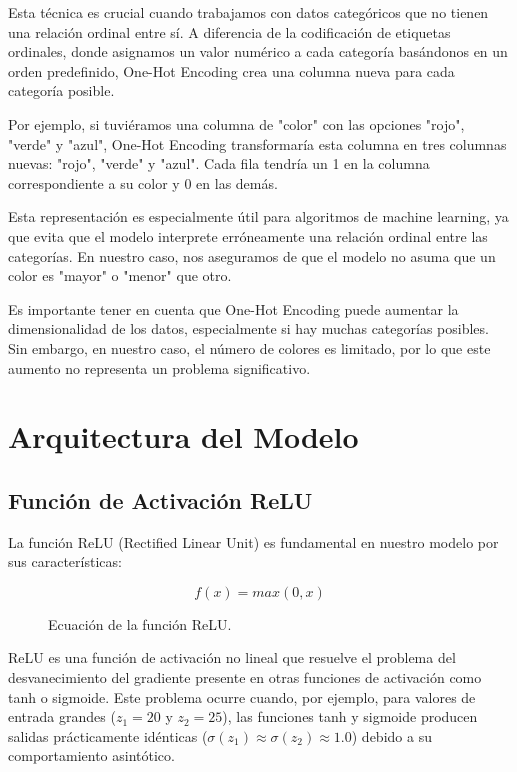 Esta técnica es crucial cuando trabajamos con datos categóricos que no tienen una relación ordinal entre sí. A diferencia de la codificación de etiquetas ordinales, donde asignamos un valor numérico a cada categoría basándonos en un orden predefinido, One-Hot Encoding crea una columna nueva para cada categoría posible.

Por ejemplo, si tuviéramos una columna de "color" con las opciones "rojo", "verde" y "azul", One-Hot Encoding transformaría esta columna en tres columnas nuevas: "rojo", "verde" y "azul". Cada fila tendría un 1 en la columna correspondiente a su color y 0 en las demás.

Esta representación es especialmente útil para algoritmos de machine learning, ya que evita que el modelo interprete erróneamente una relación ordinal entre las categorías. En nuestro caso, nos aseguramos de que el modelo no asuma que un color es "mayor" o "menor" que otro.

Es importante tener en cuenta que One-Hot Encoding puede aumentar la dimensionalidad de los datos, especialmente si hay muchas categorías posibles. Sin embargo, en nuestro caso, el número de colores es limitado, por lo que este aumento no representa un problema significativo.

\section{Arquitectura del Modelo}

\subsection{Función de Activación ReLU}
La función ReLU (Rectified Linear Unit) es fundamental en nuestro modelo por sus características:

\begin{figure}[h!]
    \centering
    \begin{equation}
        f(x) = max(0, x)
    \end{equation}
    \caption{Ecuación de la función ReLU.}
    \label{fig:relu_equation}
\end{figure}

ReLU es una función de activación no lineal que resuelve el problema del desvanecimiento del gradiente presente en otras funciones de activación como tanh o sigmoide. Este problema ocurre cuando, por ejemplo, para valores de entrada grandes ($z_1 = 20$ y $z_2 = 25$), las funciones tanh y sigmoide producen salidas prácticamente idénticas ($\sigma(z_1) \approx \sigma(z_2) \approx 1.0$) debido a su comportamiento asintótico.

